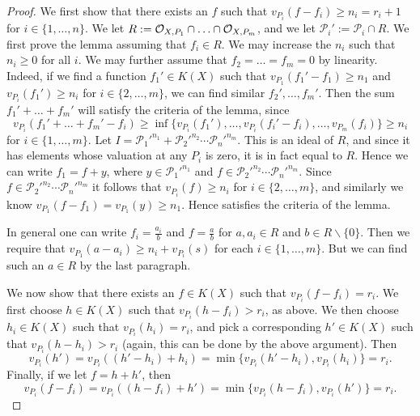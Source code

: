     \begin{proof}
    We first show that there exists an $f$ such that $v_{P_i}(f- f_i) \geq n_i = r_i +1$ for $i \in \{1, \ldots, n\}$.
    We let $R:= {\cal O}_{X,P_1} \cap \ldots \cap {\cal O}_{X,P_m}$, and we let $\mathcal{P}_i' := \mathcal{P}_i \cap R$.
    We first prove the lemma assuming that $f_i \in R$.
    We may increase the $n_i$ such that $n_i\geq 0$ for all $i$.
    We may further assume that $f_2 = \ldots = f_m =0$ by linearity.
    Indeed, if we find a function $f_1' \in K(X)$ such that $v_{P_1}(f_1' - f_1) \geq n_1$ and $v_{P_i}(f_1') \geq n_i$ for $i \in \{2, \ldots, m\}$, we can find similar $f_2', \ldots, f_m'$.
    Then the sum $f_1' + \ldots + f_m'$  will satisfy the criteria of the lemma, since
        \[
        v_{P_i}(f_1' + \ldots + f_m' - f_i) \geq \inf\{v_{P_i}(f_1'), \ldots,  v_{P_i}(f_i' - f_i), \ldots, v_{P_m}(f_i)\} \geq n_i
        \]  
    for $i \in \{1, \ldots, m\}$.
    Let $I = {\mathcal{P}_1'}^{n_1} + {\mathcal{P}_2'}^{n_2}\cdots {\mathcal{P}_n'}^{n_m}$.
    This is an ideal of $R$, and since it has elements whose valuation at any $P_i$ is zero, it is in fact equal to $R$.
    Hence we can write $f_1 = f + y$, where $y \in {\mathcal{P}_1'}^{n_1}$ and $f\in {\mathcal{P}_2'}^{n_2}\cdots {\mathcal{P}_n'}^{n_m}$.
    Since $f\in {\mathcal{P}_2'}^{n_2}\cdots {\mathcal{P}_n'}^{n_m}$ it follows that $v_{P_i}(f) \geq n_i$ for $i \in \{2, \ldots, m\}$, and similarly we know $v_{P_1}(f - f_1) = v_{P_1}(y) \geq n_1$.
    Hence satisfies the criteria of the lemma.
    
    In general one can write $f_i = \frac{a_i}{b}$ and $f = \frac{a}{b}$ for $a,a_i\in R$ and $b\in R\backslash \{0\}$.
    Then we require that $v_{P_1}(a-a_i) \geq n_i + v_{P_i}(s)$ for each $i \in \{1, \ldots, m\}$.
    But we can find such an $a \in R$ by the last paragraph.

    We now show that there exists an $f \in K(X)$ such that $v_{P_i}(f - f_i) = r_i$.
    We first choose $h \in K(X)$ such that $v_{P_i}(h - f_i) > r_i$, as above.
    We then choose $h_i \in K(X)$ such that $v_{P_i}(h_i) = r_i$, and pick a corresponding $h' \in K(X)$ such that $v_{P_i}(h - h_i) > r_i$ (again, this can be done by the above argument).
    Then
        \[
        v_{P_i}(h') = v_{P_i}((h'-h_i) + h_i) = \min\{v_{P_i}(h'-h_i),v_{P_i}(h_i)\} = r_i.
        \]
    Finally, if we let $f = h + h'$, then
        \[
        v_{P_i}(f - f_i) = v_{P_i}((h-f_i) + h') = \min\{v_{P_i}(h - f_i), v_{P_i}(h')\} = r_i.
        \]  
    \end{proof}

